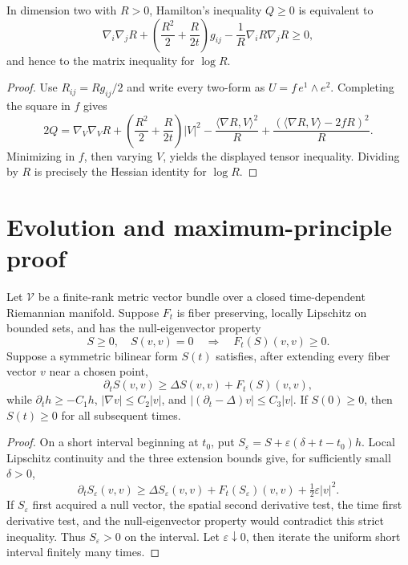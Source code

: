 \begin{proposition}
\label{prop:chow-ii-equivalent-surface-matrix-harnack-forms}
In dimension two with \(R>0\), Hamilton's inequality \(Q\ge0\) is equivalent
to
\[
\nabla_i\nabla_jR+\left(\frac{R^2}{2}+\frac{R}{2t}\right)g_{ij}
-\frac1R\nabla_iR\nabla_jR\ge0,
\]
and hence to the matrix inequality for \(\log R\).
\end{proposition}
\begin{proof}
Use \(R_{ij}=Rg_{ij}/2\) and write every two-form as
\(U=f\,e^1\wedge e^2\).  Completing the square in \(f\) gives
\[
2Q=\nabla_V\nabla_VR+\left(\frac{R^2}{2}+\frac{R}{2t}\right)|V|^2
-\frac{\langle\nabla R,V\rangle^2}{R}
+\frac{(\langle\nabla R,V\rangle-2fR)^2}{R}.
\]
Minimizing in \(f\), then varying \(V\), yields the displayed tensor
inequality.  Dividing by \(R\) is precisely the Hessian identity for
\(\log R\).
\end{proof}

\section{Evolution and maximum-principle proof}

\begin{proposition}
\label{prop:chow-ii-bilinear-form-maximum-principle}
Let \(\mathcal V\) be a finite-rank metric vector bundle over a closed
time-dependent Riemannian manifold.  Suppose \(F_t\) is fiber preserving,
locally Lipschitz on bounded sets, and has the null-eigenvector property
\[
S\ge0,\quad S(v,v)=0\quad\Longrightarrow\quad F_t(S)(v,v)\ge0.
\]
Suppose a symmetric bilinear form \(S(t)\) satisfies, after extending every
fiber vector \(v\) near a chosen point,
\[
\partial_tS(v,v)\ge\Delta S(v,v)+F_t(S)(v,v),
\]
while \(\partial_th\ge-C_1h\), \(|\nabla v|\le C_2|v|\), and
\(|(\partial_t-\Delta)v|\le C_3|v|\).  If \(S(0)\ge0\), then
\(S(t)\ge0\) for all subsequent times.
\end{proposition}
\begin{proof}
On a short interval beginning at \(t_0\), put
\(S_\varepsilon=S+\varepsilon(\delta+t-t_0)h\).  Local Lipschitz continuity
and the three extension bounds give, for sufficiently small \(\delta>0\),
\[
\partial_tS_\varepsilon(v,v)\ge\Delta S_\varepsilon(v,v)
+F_t(S_\varepsilon)(v,v)+\tfrac12\varepsilon|v|^2.
\]
If \(S_\varepsilon\) first acquired a null vector, the spatial second
derivative test, the time first derivative test, and the null-eigenvector
property would contradict this strict inequality.  Thus
\(S_\varepsilon>0\) on the interval.  Let \(\varepsilon\downarrow0\), then
iterate the uniform short interval finitely many times.
\end{proof}


